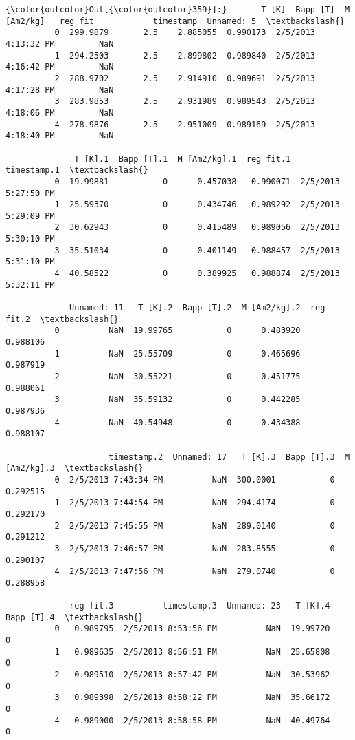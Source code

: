 \documentclass{article}
\begin{document}
            \begin{Verbatim}[commandchars=\\\{\}]
{\color{outcolor}Out[{\color{outcolor}359}]:}       T [K]  Bapp [T]  M [Am2/kg]   reg fit            timestamp  Unnamed: 5  \textbackslash{}
          0  299.9879       2.5    2.885055  0.990173  2/5/2013 4:13:32 PM         NaN   
          1  294.2503       2.5    2.899802  0.989840  2/5/2013 4:16:42 PM         NaN   
          2  288.9702       2.5    2.914910  0.989691  2/5/2013 4:17:28 PM         NaN   
          3  283.9853       2.5    2.931989  0.989543  2/5/2013 4:18:06 PM         NaN   
          4  278.9876       2.5    2.951009  0.989169  2/5/2013 4:18:40 PM         NaN   
          
              T [K].1  Bapp [T].1  M [Am2/kg].1  reg fit.1          timestamp.1  \textbackslash{}
          0  19.99881           0      0.457038   0.990071  2/5/2013 5:27:50 PM   
          1  25.59370           0      0.434746   0.989292  2/5/2013 5:29:09 PM   
          2  30.62943           0      0.415489   0.989056  2/5/2013 5:30:10 PM   
          3  35.51034           0      0.401149   0.988457  2/5/2013 5:31:10 PM   
          4  40.58522           0      0.389925   0.988874  2/5/2013 5:32:11 PM   
          
             Unnamed: 11   T [K].2  Bapp [T].2  M [Am2/kg].2  reg fit.2  \textbackslash{}
          0          NaN  19.99765           0      0.483920   0.988106   
          1          NaN  25.55709           0      0.465696   0.987919   
          2          NaN  30.55221           0      0.451775   0.988061   
          3          NaN  35.59132           0      0.442285   0.987936   
          4          NaN  40.54948           0      0.434388   0.988107   
          
                     timestamp.2  Unnamed: 17   T [K].3  Bapp [T].3  M [Am2/kg].3  \textbackslash{}
          0  2/5/2013 7:43:34 PM          NaN  300.0001           0      0.292515   
          1  2/5/2013 7:44:54 PM          NaN  294.4174           0      0.292170   
          2  2/5/2013 7:45:55 PM          NaN  289.0140           0      0.291212   
          3  2/5/2013 7:46:57 PM          NaN  283.8555           0      0.290107   
          4  2/5/2013 7:47:56 PM          NaN  279.0740           0      0.288958   
          
             reg fit.3          timestamp.3  Unnamed: 23   T [K].4  Bapp [T].4  \textbackslash{}
          0   0.989795  2/5/2013 8:53:56 PM          NaN  19.99720           0   
          1   0.989635  2/5/2013 8:56:51 PM          NaN  25.65808           0   
          2   0.989510  2/5/2013 8:57:42 PM          NaN  30.53962           0   
          3   0.989398  2/5/2013 8:58:22 PM          NaN  35.66172           0   
          4   0.989000  2/5/2013 8:58:58 PM          NaN  40.49764           0   
          

\end{Verbatim}
\end{document}
